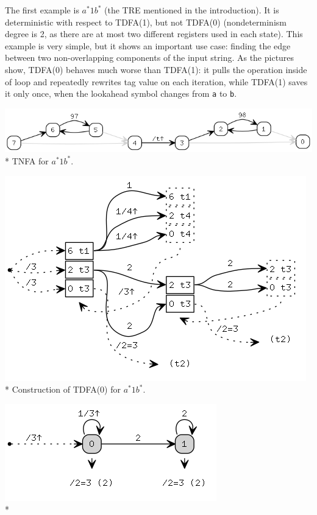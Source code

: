 \documentclass{article}
\theoremstyle{definition}
\begin{document}
\begin{multicols}{2}
The first example is $a^* 1 b^*$ (the TRE mentioned in the introduction).
It is deterministic with respect to TDFA(1), but not TDFA(0)
(nondeterminism degree is 2, as there are at most two different registers used in each state).
This example is very simple, but it shows an important use case:
finding the edge between two non-overlapping components of the input string.
As the pictures show, TDFA(0) behaves much worse than TDFA(1):
it pulls the operation inside of loop and repeatedly rewrites tag value on each iteration,
while TDFA(1) saves it only once, when the lookahead symbol changes from \texttt{a} to \texttt{b}.
\begin{center}
\includegraphics[width=\linewidth]{img/example1/tnfa.png}\\*
\footnotesize{TNFA for $a^* 1 b^*$.} \\
\end{center}
\begin{center}
\includegraphics[width=0.8\linewidth]{img/example1/tdfa0_raw.png}\\*
\footnotesize{Construction of TDFA(0) for $a^* 1 b^*$.} \\
\end{center}
\begin{center}
\includegraphics[width=0.6\linewidth]{img/example1/tdfa0.png}\\*

\end{center}
\end{multicols}
\end{document}
